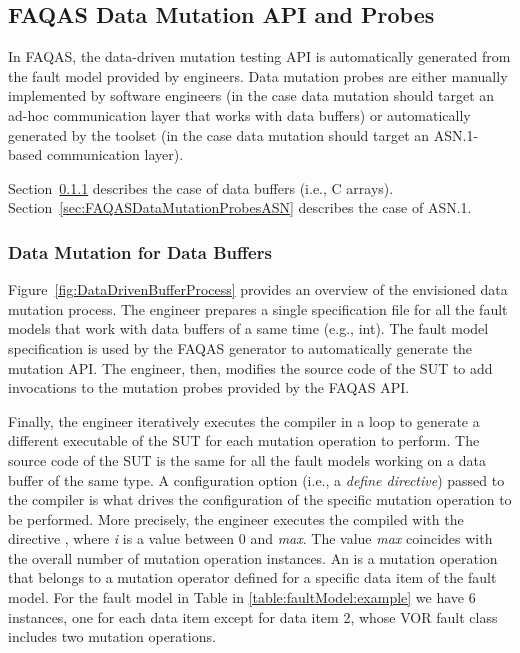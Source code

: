 





\clearpage
\subsection{FAQAS Data Mutation API and Probes}
\label{sec:FAQASDataMutationProbes}

In FAQAS, the data-driven mutation testing API is automatically generated from the fault model provided by engineers. Data mutation probes are either manually implemented by software engineers (in the case data mutation should target an ad-hoc communication layer that works with data buffers) or automatically generated by the toolset (in the case data mutation should target an ASN.1-based communication layer).

Section~\ref{sec:FAQASDataMutationProbesBuffer} describes the case of data buffers (i.e., C arrays).
Section~\ref{sec:FAQASDataMutationProbesASN} describes the case of ASN.1.


\subsubsection{Data Mutation for Data Buffers}
\label{sec:FAQASDataMutationProbesBuffer}

Figure~\ref{fig:DataDrivenBufferProcess} provides an overview of the envisioned data mutation process. 
The engineer prepares a single specification file for all the fault models that work with data buffers of a same time (e.g., int). The fault model specification is used by the FAQAS generator to automatically generate the mutation API. The engineer, then, modifies the source code of the SUT to add invocations to the mutation probes provided by the FAQAS API. 

Finally, the engineer iteratively executes the compiler in a loop to generate a different executable of the SUT for each mutation operation to perform.
The source code of the SUT is the same for all the fault models working on a data buffer of the same type. A configuration option (i.e., a \emph{define directive}) passed to the compiler is what drives the configuration of the specific mutation operation to be performed. 
More precisely, the engineer executes the compiled with the directive , where \emph{i} is a value between 0 and \emph{max}. The value \emph{max} coincides with the
overall number of mutation operation instances. An  is a mutation operation that belongs to a mutation operator defined for a specific data item of the fault model. For the fault model in Table in \ref{table:faultModel:example} we have 6 instances, one for each data item except for data item 2, whose VOR fault class includes two mutation operations.

